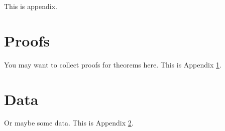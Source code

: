 \documentclass[letterpaper, 11pt]{article}
\begin{document}


\newpage
\renewcommand{\appendixpagename}{Appendix}

\appendix
\appendixpage

This is appendix.

\section{Proofs} \label{appendix:proofs}

You may want to collect proofs for theorems here. This is Appendix \ref{appendix:proofs}.

\section{Data} \label{appendix:data}

Or maybe some data. This is Appendix \ref{appendix:data}.
\end{document}
